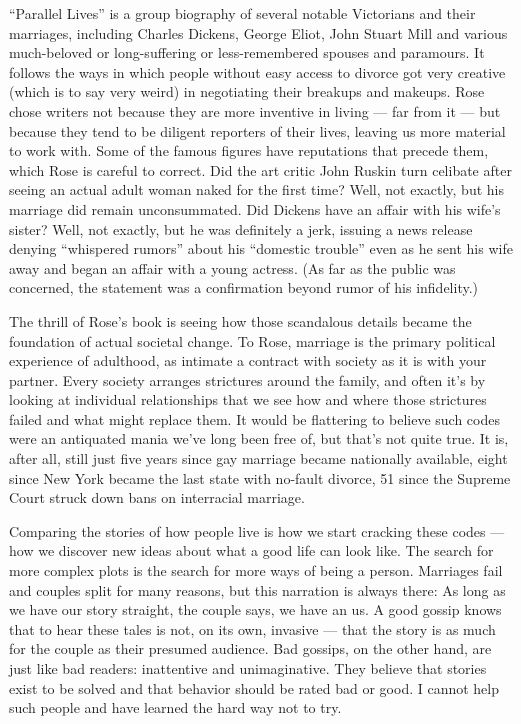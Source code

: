 ``Parallel Lives'' is a group biography of several notable Victorians
and their marriages, including Charles Dickens, George Eliot, John
Stuart Mill and various much-beloved or long-suffering or
less-remembered spouses and paramours. It follows the ways in which
people without easy access to divorce got very creative (which is to say
very weird) in negotiating their breakups and makeups. Rose chose
writers not because they are more inventive in living --- far from it
--- but because they tend to be diligent reporters of their lives,
leaving us more material to work with. Some of the famous figures have
reputations that precede them, which Rose is careful to correct. Did the
art critic John Ruskin turn celibate after seeing an actual adult woman
naked for the first time? Well, not exactly, but his marriage did remain
unconsummated. Did Dickens have an affair with his wife's sister? Well,
not exactly, but he was definitely a jerk, issuing a news release
denying ``whispered rumors'' about his ``domestic trouble'' even as he
sent his wife away and began an affair with a young actress. (As far as
the public was concerned, the statement was a confirmation beyond rumor
of his infidelity.)

The thrill of Rose's book is seeing how those scandalous details became
the foundation of actual societal change. To Rose, marriage is the
primary political experience of adulthood, as intimate a contract with
society as it is with your partner. Every society arranges strictures
around the family, and often it's by looking at individual relationships
that we see how and where those strictures failed and what might replace
them. It would be flattering to believe such codes were an antiquated
mania we've long been free of, but that's not quite true. It is, after
all, still just five years since gay marriage became nationally
available, eight since New York became the last state with no-fault
divorce, 51 since the Supreme Court struck down bans on interracial
marriage.

Comparing the stories of how people live is how we start cracking these
codes --- how we discover new ideas about what a good life can look
like. The search for more complex plots is the search for more ways of
being a person. Marriages fail and couples split for many reasons, but
this narration is always there: As long as we have our story straight,
the couple says, we have an us. A good gossip knows that to hear these
tales is not, on its own, invasive --- that the story is as much for the
couple as their presumed audience. Bad gossips, on the other hand, are
just like bad readers: inattentive and unimaginative. They believe that
stories exist to be solved and that behavior should be rated bad or
good. I cannot help such people and have learned the hard way not to
try.

